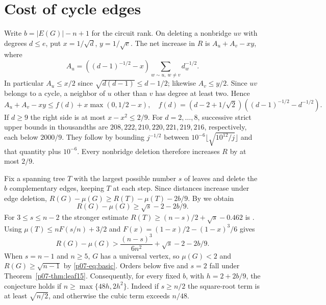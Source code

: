 \documentclass[11pt,a4paper]{article}
\begin{document}
\section{Cost of cycle edges}\label{p07-sec:cycleloss}
Write $b=|E(G)|-n+1$ for the circuit rank. On deleting a nonbridge
$uv$ with degrees $d\le e$, put $x=1/\sqrt d$, $y=1/\sqrt e$.
The net increase in $R$ is $A_u+A_v-xy$, where
\[
 A_u=((d-1)^{-1/2}-x)\sum_{w\sim u,\ w\ne v}d_w^{-1/2}.
\]
In particular $A_u\le x/2$ since
$\sqrt{d(d-1)}\le d-1/2$; likewise $A_v\le y/2$.
Since $uv$ belongs to a cycle, a neighbor of $u$ other than $v$ has
degree at least two. Hence
\[
 A_u+A_v-xy\le f(d)+x\max(0,1/2-x),\quad
 f(d)=(d-2+1/\sqrt2)((d-1)^{-1/2}-d^{-1/2}).
\]
If $d\ge9$ the right side is at most $x-x^2\le 2/9$. For $d=2,\ldots,8$,
successive strict upper bounds in thousandths are
$208,222,210,220,221,219,216$, respectively, each below $2000/9$.
They follow by bounding $j^{-1/2}$ between
$10^{-6}\lfloor\sqrt{10^{12}/j}\rfloor$ and that quantity plus $10^{-6}$.
Every nonbridge deletion therefore increases $R$ by at most $2/9$.

Fix a spanning tree $T$ with the largest possible number $s$ of leaves
and delete the $b$ complementary edges, keeping $T$ at each step.
Since distances increase under edge deletion, $R(G)-\mu(G)\ge
R(T)-\mu(T)-2b/9$. By \cite[Theorem~1.2]{p07-CPSMean} we obtain
\[
 R(G)-\mu(G)\ge\sqrt{s}-2-2b/9.
\]
For $3\le s\le n-2$ the stronger estimate
$R(T)\ge(n-s)/2+\sqrt{s}-0.462$ is
\cite[Corollary~2.3]{p07-CPSMean}. Using $\mu(T)\le nF(s/n)+3/2$ and
$F(x)=(1-x)/2-(1-x)^3/6$ gives
\[
 R(G)-\mu(G)>\frac{(n-s)^3}{6n^2}+\sqrt{s}-2-2b/9.
\]
When $s=n-1$ and $n\ge5$, $G$ has a universal vertex, so $\mu(G)<2$ and
$R(G)\ge\sqrt{n-1}$ by \eqref{p07-eq:basic}. Orders below five and $s=2$ fall under Theorem~\ref{p07-thm:leaf15}. Consequently,
for every fixed $b$, with $h=2+2b/9$, the conjecture holds if
$n\ge\max\{48h,2h^2\}$. Indeed if $s\ge n/2$ the square-root term
is at least $\sqrt{n/2}$, and otherwise the cubic term exceeds $n/48$.
\end{document}

